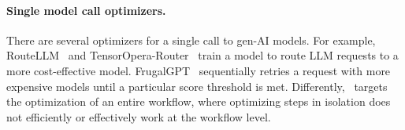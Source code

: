 \paragraph{Single model call optimizers.} There are several optimizers for a single call to gen-AI models. For example, RouteLLM~\cite{routellm} and TensorOpera-Router~\cite{tensor-opera-router} train a model to route LLM requests to a more cost-effective model. %
FrugalGPT~\cite{frugalgpt} sequentially retries a request with more expensive models until a particular score threshold is met. 
Differently, \sysname\ targets the optimization of an entire workflow, where optimizing steps in isolation does not efficiently or effectively work at the workflow level.
